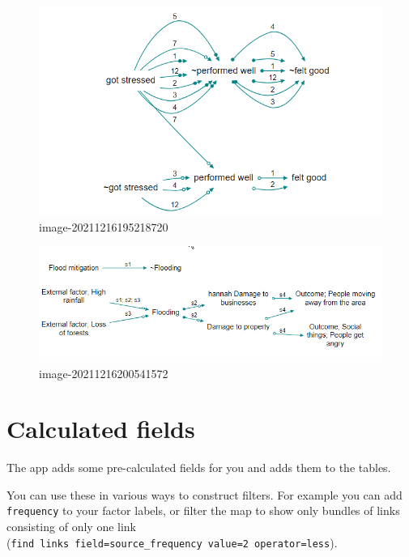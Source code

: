 \documentclass[
]{book}
\begin{document}
\begin{figure}
\centering
\includegraphics[width=6.77083in,height=\textheight]{_assets/image-20211216195218720.png}
\caption{image-20211216195218720}
\end{figure}

\begin{figure}
\centering
\includegraphics[width=6.77083in,height=\textheight]{_assets/image-20211216200541572.png}
\caption{image-20211216200541572}
\end{figure}

\hypertarget{xcalculated-fields}{%
\section{Calculated fields}\label{xcalculated-fields}}

The app adds some pre-calculated fields for you and adds them to the tables.

You can use these in various ways to construct filters. For example you can add \texttt{frequency} to your factor labels, or filter the map to show only bundles of links consisting of only one link (\texttt{find\ links\ field=source\_frequency\ value=2\ operator=less}).
\end{document}
